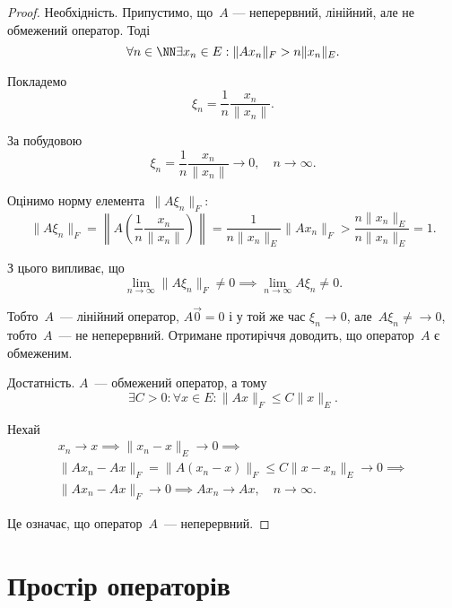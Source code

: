 \begin{proof}
Необхідність. Припустимо, що~$A$ ---
неперервний, лінійний, але не обмежений оператор. Тоді
\begin{equation*}
    \forall n \in \NN \exists x_n \in E: \|Ax_n\|_F > n \|x_n\|_E.
\end{equation*}

Покладемо
\begin{equation*}
    \xi_n = \frac{1}{n} \frac{x_n}{\|x_n\|}.
\end{equation*}

За побудовою
\begin{equation*}
    \xi_n = \frac{1}{n} \frac{x_n}{\|x_n\|} \to 0, \quad n \to \infty.
\end{equation*}

Оцінимо норму елемента~$\|A \xi_n\|_F$:
\begin{equation*}
    \|A \xi_n\|_F = \left\| A \left( \frac{1}{n} \frac{x_n}{\|x_n\|} \right) \right\| =
    \frac{1}{n \|x_n\|_E} \|A x_n\|_F > \frac{n \|x_n\|_E}{n \|x_n\|_E} = 1.
\end{equation*}

З цього випливає, що
\begin{equation*}
    \lim_{n \to \infty} \|A \xi_n\|_F \ne 0 \implies
    \lim_{n \to \infty} A \xi_n \ne 0.
\end{equation*}

Тобто~$A$~--- лінійний оператор, $A \vec 0 = 0$ і у той же час
$\xi_n \to 0$, але~$A \xi_n \ne\to 0$, тобто~$A$~--- не неперервний.
Отримане протиріччя доводить, що оператор~$A$ є обмеженим.

Достатність. $A$~--- обмежений оператор, а тому
\begin{equation*}
    \exists C > 0: \forall x \in E: \|A x\|_F \le C \|x\|_E.
\end{equation*}

Нехай
\begin{multline*}
    x_n \to x \implies \|x_n - x\|_E \to 0 \implies \\
    \|Ax_n - Ax\|_F = \|A (x_n - x)\|_F \le C \|x - x_n\|_E \to 0 \implies \\
    \|A x_n - A x\|_F \to 0 \implies A x_n \to A x, \quad n \to \infty.
\end{multline*}

Це означає, що оператор~$A$~--- неперервний. 
\end{proof}

\section{Простір операторів}

